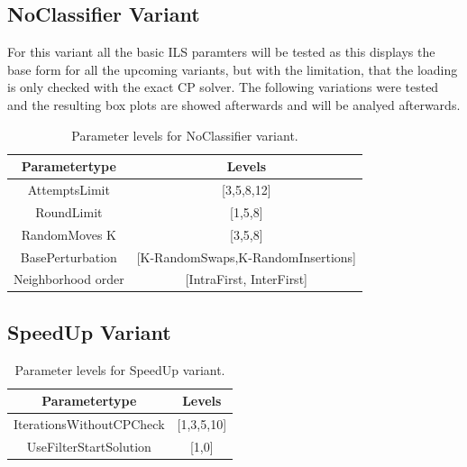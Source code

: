 \subsection{NoClassifier Variant}
\label{subsec_parameterStuy_noclassifier}
For this variant all the basic \gls{ILS} paramters will be tested as this displays the base form
for all the upcoming variants, but with the limitation, that the loading is only checked
with the exact \gls{CP} solver.
The following variations were tested and the resulting box plots are showed afterwards and
will be analyed afterwards.


\begin{table}[ht]
    \centering
    \begin{tabular}{c c }
        \toprule
        Parametertype      & Levels                             \\
        \midrule
        AttemptsLimit      & [3,5,8,12]                         \\
        RoundLimit         & [1,5,8]                            \\
        RandomMoves K      & [3,5,8]                            \\
        BasePerturbation   & [K-RandomSwaps,K-RandomInsertions] \\
        Neighborhood order & [IntraFirst, InterFirst]           \\
        \bottomrule
    \end{tabular}
    \caption{Parameter levels for NoClassifier variant.}
    \label{tab:parameters_noclassifier}
\end{table}

\subsection{SpeedUp Variant}
\label{subsec_parameterStuy_speedup}

\begin{table}[ht]
    \centering
    \begin{tabular}{c c }
        \toprule
        Parametertype            & Levels     \\
        \midrule
        IterationsWithoutCPCheck & [1,3,5,10] \\
        UseFilterStartSolution   & [1,0]      \\
        \bottomrule
    \end{tabular}
    \caption{Parameter levels for SpeedUp variant.}
    \label{tab:parameters_speedup}
\end{table}

